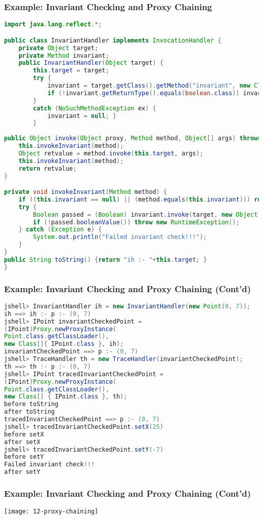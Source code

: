 \subsubsection{Example: Invariant Checking and Proxy Chaining}

\begin{lstlisting}[language=Java]
import java.lang.reflect.*;

public class InvariantHandler implements InvocationHandler {
	private Object target;
	private Method invariant;
	public InvariantHandler(Object target) {
		this.target = target;
		try {
			invariant = target.getClass().getMethod("invariant", new Class<?>[]{});
			if (!invariant.getReturnType().equals(boolean.class)) invariant = null;
		} 
		catch (NoSuchMethodException ex) { 
			invariant = null; }
		}
		
public Object invoke(Object proxy, Method method, Object[] args) throws Throwable {
	this.invokeInvariant(method);
	Object retvalue = method.invoke(this.target, args);
	this.invokeInvariant(method);
	return retvalue;
}

private void invokeInvariant(Method method) {
	if ((this.invariant == null) || (method.equals(this.invariant))) return;
	try {
		Boolean passed = (Boolean) invariant.invoke(target, new Object[]{});
		if (!passed.booleanValue()) throw new RuntimeException();
	} catch (Exception e) {
		System.out.println("Failed invariant check!!!"); 
	}
}
public String toString() {return "ih :- "+this.target; }
}
\end{lstlisting}

\subsubsection{Example: Invariant Checking and Proxy Chaining (Cont'd)}

\begin{lstlisting}[language=Java]
jshell> InvariantHandler ih = new InvariantHandler(new Point(0, 7));
ih ==> ih :- p :- (0, 7)
jshell> IPoint invariantCheckedPoint =
(IPoint)Proxy.newProxyInstance(
Point.class.getClassLoader(),
new Class[]{ IPoint.class }, ih);
invariantCheckedPoint ==> p :- (0, 7)
jshell> TraceHandler th = new TraceHandler(invariantCheckedPoint);
th ==> th :- p :- (0, 7)
jshell> IPoint tracedInvariantCheckedPoint =
(IPoint)Proxy.newProxyInstance(
Point.class.getClassLoader(),
new Class[] { IPoint.class }, th);
before toString
after toString
tracedInvariantCheckedPoint ==> p :- (0, 7)
jshell> tracedInvariantCheckedPoint.setX(25)
before setX
after setX
jshell> tracedInvariantCheckedPoint.setY(-7)
before setY
Failed invariant check!!!
after setY
\end{lstlisting}

\subsubsection{Example: Invariant Checking and Proxy Chaining (Cont'd)}

\begin{center}
\texttt{[image: 12-proxy-chaining]}
\end{center}


 
